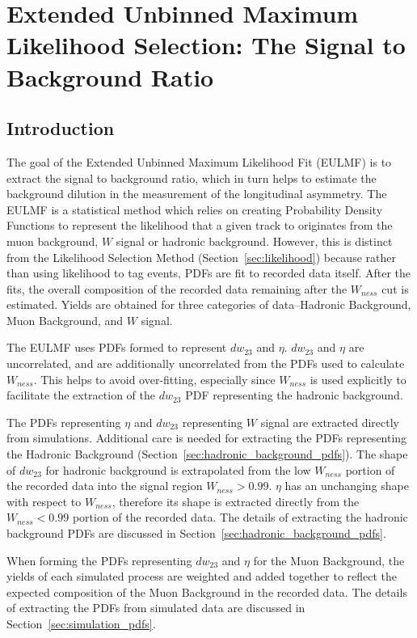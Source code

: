 \clearpage
\section{Extended Unbinned Maximum Likelihood Selection: The Signal to
Background Ratio}
\label{sec:sbr}

\subsection{Introduction}
\label{sec:sbr_intro}
The goal of the Extended Unbinned Maximum Likelihood Fit (EULMF) is to extract
the signal to background ratio, which in turn helps to estimate the background
dilution in the measurement of the longitudinal asymmetry. The EULMF is a
statistical method which relies on creating Probability Density Functions to
represent the likelihood that a given track to originates from the muon
background, $W$ signal or hadronic background. However, this is distinct from
the Likelihood Selection Method (Section~\ref{sec:likelihood}) because rather
than using likelihood to tag events, PDFs are fit to recorded data itself.
After the fits, the overall composition of the recorded data remaining after the
$W_{ness}$ cut is estimated. Yields are obtained for three categories of
data--Hadronic Background, Muon Background, and $W$ signal. 

The EULMF uses PDFs formed to represent $dw_{23}$ and $\eta$. $dw_{23}$ and
$\eta$ are uncorrelated, and are additionally uncorrelated from the PDFs used to
calculate $W_{ness}$. This helps to avoid over-fitting, especially since
$W_{ness}$ is used explicitly to facilitate the extraction of the $dw_{23}$ PDF
representing the hadronic background. 

The PDFs representing $\eta$ and $dw_{23}$ representing  $W$ signal are
extracted directly from simulations. Additional care is needed for extracting
the PDFs representing the Hadronic Background
(Section~\ref{sec:hadronic_background_pdfs}). The shape of $dw_{23}$ for
hadronic background is extrapolated from the low $W_{ness}$ portion of the
recorded data into the signal region $W_{ness} > 0.99$. $\eta$ has an unchanging
shape with respect to $W_{ness}$, therefore its shape is extracted directly from
the $W_{ness} < 0.99$ portion of the recorded data. The details of extracting
the hadronic background PDFs are discussed in
Section~\ref{sec:hadronic_background_pdfs}.

When forming the PDFs representing $dw_{23}$ and $\eta$ for the Muon Background,
the yields of each simulated process are weighted and added together to reflect
the expected composition of the Muon Background in the recorded data. The
details of extracting the PDFs from simulated data are discussed in
Section~\ref{sec:simulation_pdfs}. 

